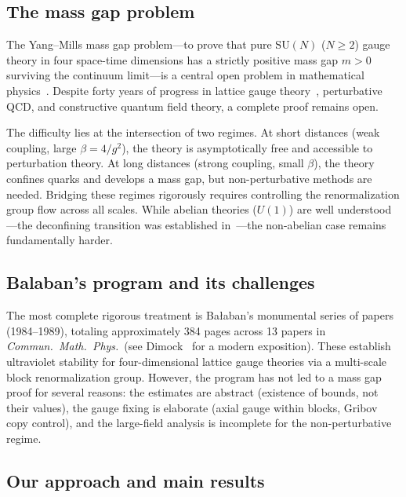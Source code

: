 \documentclass[11pt]{article}
\theoremstyle{definition}
\newcommand{\SU}{\mathrm{SU}}
\begin{document}
\subsection{The mass gap problem}

The Yang--Mills mass gap problem---to prove that pure $\SU(N)$ ($N\ge 2$) gauge
theory in four space-time dimensions has a strictly positive mass gap
$m>0$ surviving the continuum limit---is a central open problem in
mathematical physics~\cite{JaffeWitten}.
Despite forty years of progress in lattice gauge
theory~\cite{Creutz80,OS73}, perturbative QCD, and constructive
quantum field theory, a complete proof remains open.

The difficulty lies at the intersection of two regimes.  At short
distances (weak coupling, large $\beta=4/g^2$), the theory is
asymptotically free and accessible to perturbation theory.  At long
distances (strong coupling, small $\beta$), the theory confines quarks
and develops a mass gap, but non-perturbative methods are needed.
Bridging these regimes rigorously requires controlling the renormalization
group flow across all scales.  While abelian theories ($U(1)$) are well
understood---the deconfining transition was established
in~\cite{Guth80,FS82}---the non-abelian case remains fundamentally harder.

\subsection{Balaban's program and its challenges}

The most complete rigorous treatment is Ba\l aban's monumental series
of papers~\cite{BalabanI,BalabanII,BalabanIII,BalabanLF1,BalabanLF2}
(1984--1989), totaling approximately 384 pages across 13 papers in
\emph{Commun.\ Math.\ Phys.}\ (see Dimock~\cite{DimockI,DimockII}
for a modern exposition).  These establish ultraviolet stability for
four-dimensional lattice gauge theories via a multi-scale block
renormalization group.  However, the program has not led to a mass gap
proof for several reasons: the estimates are abstract (existence of
bounds, not their values), the gauge fixing is elaborate (axial gauge
within blocks, Gribov copy control), and the large-field analysis is
incomplete for the non-perturbative regime.

\subsection{Our approach and main results}
\end{document}
